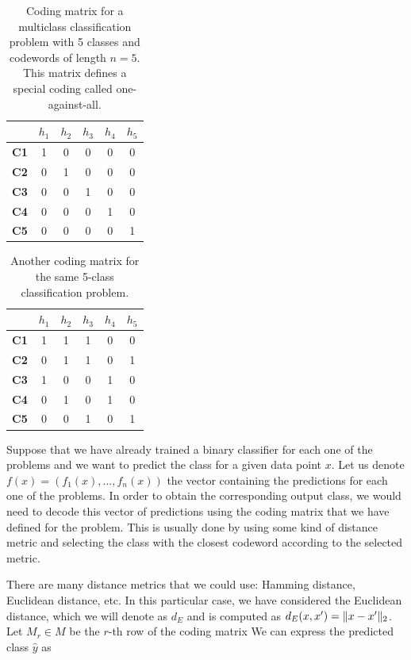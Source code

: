 \begin{table}[H]
\centering
\begin{tabular}{c|ccccc}
            & $h_1$ & $h_2$ & $h_3$ & $h_4$ & $h_5$ \\ \hline
\textbf{C1} & 1     & 0     & 0     & 0     & 0     \\
\textbf{C2} & 0     & 1     & 0     & 0     & 0     \\
\textbf{C3} & 0     & 0     & 1     & 0     & 0     \\
\textbf{C4} & 0     & 0     & 0     & 1     & 0     \\
\textbf{C5} & 0     & 0     & 0     & 0     & 1    
\end{tabular}%
\caption{Coding matrix for a multiclass classification problem with 5 classes and codewords of length $n=5$.
This matrix defines a special coding called one-against-all.}
\label{tab:ecoc_example_identity}
\end{table}


\begin{table}[H]
\centering
\begin{tabular}{c|ccccc}
            & $h_1$ & $h_2$ & $h_3$ & $h_4$ & $h_5$ \\ \hline
\textbf{C1} & 1     & 1     & 1     & 0     & 0     \\
\textbf{C2} & 0     & 1     & 1     & 0     & 1     \\
\textbf{C3} & 1     & 0     & 0     & 1     & 0     \\
\textbf{C4} & 0     & 1     & 0     & 1     & 0     \\
\textbf{C5} & 0     & 0     & 1     & 0     & 1    
\end{tabular}
\caption{Another coding matrix for the same 5-class classification problem.}
\label{tab:ecoc_example_complex}
\end{table}

Suppose that we have already trained a binary classifier for each one of the problems and we want to
predict the class for a given data point $x$. Let us denote $f(x) = (f_1(x), \dots, f_n(x))$ the
vector containing the predictions for each one of the problems. In order to obtain the corresponding output
class, we would need to decode this vector of predictions using the coding matrix that we have defined
for the problem. This is usually done by using some kind of distance metric and selecting the class with
the closest codeword according to the selected metric.

There are many distance metrics that we could use: Hamming distance, Euclidean distance, etc. In this
particular case, we have considered the Euclidean distance, which we will denote as $d_E$ and is computed
as $d_E(x, x') = \lVert x - x' \rVert_2$. Let $M_r \in M$ be the $r$-th row of the coding matrix
We can express the predicted class $\hat{y}$ as

